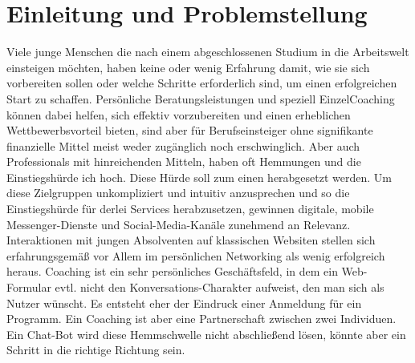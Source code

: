 \chapter{Einleitung und Problemstellung} \label{Einleitung und Problemstellung}
        
    Viele junge Menschen die nach einem abgeschlossenen Studium in die Arbeitswelt einsteigen möchten, haben keine oder wenig Erfahrung damit, wie sie sich vorbereiten sollen oder welche Schritte erforderlich sind, um einen erfolgreichen Start zu schaffen. Persönliche Beratungsleistungen und speziell Einzel\-Coaching können dabei helfen, sich effektiv vorzubereiten und einen erheblichen Wettbewerbsvorteil bieten, sind aber für Berufseinsteiger ohne signifikante finanzielle Mittel meist weder zugänglich noch erschwinglich. Aber auch Professionals mit hinreichenden Mitteln, haben oft Hemmungen und die Einstiegshürde ich hoch. Diese Hürde soll zum einen herabgesetzt werden. Um diese Zielgruppen unkompliziert und intuitiv anzusprechen und so die Einstiegshürde für derlei Services herabzusetzen, gewinnen digitale, mobile Messenger-Dienste und Social-Media-Kanäle zunehmend an Relevanz. Interaktionen mit jungen Absolventen auf klassischen Websiten stellen sich erfahrungsgemäß vor Allem im persönlichen Networking als wenig erfolgreich heraus. Coaching ist ein sehr persönliches Geschäftsfeld, in dem ein Web-Formular evtl. nicht den Konversations-Charakter aufweist, den man sich als Nutzer wünscht. Es entsteht eher der Eindruck einer Anmeldung für ein Programm. Ein Coaching ist aber eine Partnerschaft zwischen zwei Individuen. Ein Chat-Bot wird diese Hemmschwelle nicht abschließend lösen, könnte aber ein Schritt in die richtige Richtung sein.
    
